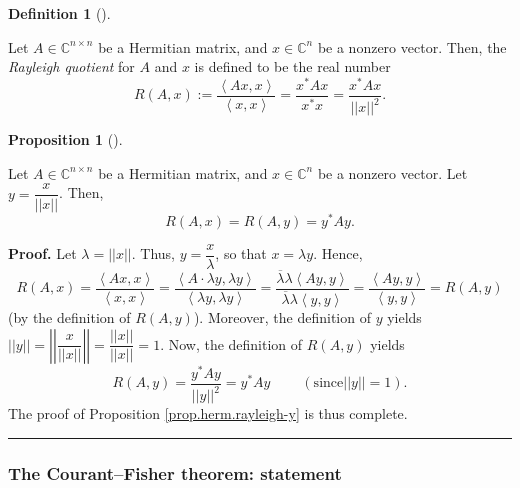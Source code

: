 \documentclass[numbers=enddot,12pt,final,onecolumn,notitlepage]{scrartcl}%
\numberwithin{exer}{subsection}
\theoremstyle{definition}
\newtheorem{prop}[theo]{Proposition}
\newenvironment{proposition}[1][]
{\begin{prop}[#1]\begin{leftbar}}
{\end{leftbar}\end{prop}}
\newtheorem{defi}[theo]{Definition}
\newenvironment{definition}[1][]
{\begin{defi}[#1]\begin{leftbar}}
{\end{leftbar}\end{defi}}
\newenvironment{proof}[1][Proof]{\noindent\textbf{#1.} }{\ \rule{0.5em}{0.5em}}
\begin{document}
\begin{definition}
\label{def.herm.rayleigh}Let $A\in\mathbb{C}^{n\times n}$ be a Hermitian
matrix, and $x\in\mathbb{C}^{n}$ be a nonzero vector. Then, the \emph{Rayleigh
quotient} for $A$ and $x$ is defined to be the real number%
\[
R\left(  A,x\right)  :=\dfrac{\left\langle Ax,x\right\rangle }{\left\langle
x,x\right\rangle }=\dfrac{x^{\ast}Ax}{x^{\ast}x}=\dfrac{x^{\ast}Ax}{\left\vert
\left\vert x\right\vert \right\vert ^{2}}.
\]

\end{definition}

\begin{proposition}
\label{prop.herm.rayleigh-y}Let $A\in\mathbb{C}^{n\times n}$ be a Hermitian
matrix, and $x\in\mathbb{C}^{n}$ be a nonzero vector. Let $y=\dfrac
{x}{\left\vert \left\vert x\right\vert \right\vert }$. Then,
\[
R\left(  A,x\right)  =R\left(  A,y\right)  =y^{\ast}Ay.
\]

\end{proposition}

\begin{proof}
Let $\lambda=\left\vert \left\vert x\right\vert \right\vert $. Thus,
$y=\dfrac{x}{\lambda}$, so that $x=\lambda y$. Hence,%
\[
R\left(  A,x\right)  =\dfrac{\left\langle Ax,x\right\rangle }{\left\langle
x,x\right\rangle }=\dfrac{\left\langle A\cdot\lambda y,\lambda y\right\rangle
}{\left\langle \lambda y,\lambda y\right\rangle }=\dfrac{\overline{\lambda
}\lambda\left\langle Ay,y\right\rangle }{\overline{\lambda}\lambda\left\langle
y,y\right\rangle }=\dfrac{\left\langle Ay,y\right\rangle }{\left\langle
y,y\right\rangle }=R\left(  A,y\right)
\]
(by the definition of $R\left(  A,y\right)  $). Moreover, the definition of
$y$ yields $\left\vert \left\vert y\right\vert \right\vert =\left\vert
\left\vert \dfrac{x}{\left\vert \left\vert x\right\vert \right\vert
}\right\vert \right\vert =\dfrac{\left\vert \left\vert x\right\vert
\right\vert }{\left\vert \left\vert x\right\vert \right\vert }=1$. Now, the
definition of $R\left(  A,y\right)  $ yields%
\[
R\left(  A,y\right)  =\dfrac{y^{\ast}Ay}{\left\vert \left\vert y\right\vert
\right\vert ^{2}}=y^{\ast}Ay\ \ \ \ \ \ \ \ \ \ \left(  \text{since
}\left\vert \left\vert y\right\vert \right\vert =1\right)  .
\]
The proof of Proposition \ref{prop.herm.rayleigh-y} is thus complete.
\end{proof}

\subsubsection{The Courant--Fisher theorem: statement}
\end{document}
